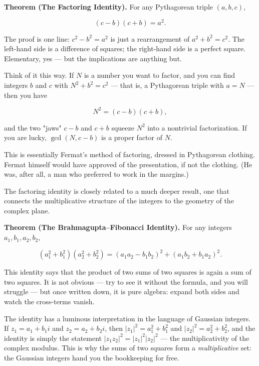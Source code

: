 \textbf{Theorem (The Factoring Identity).} For any Pythagorean triple $(a, b, c)$,

\[
(c - b)(c + b) = a^2.
\]

The proof is one line: $c^2 - b^2 = a^2$ is just a rearrangement of $a^2 + b^2 = c^2$. The left-hand side is a difference of squares; the right-hand side is a perfect square. Elementary, yes --- but the implications are anything but.

Think of it this way. If $N$ is a number you want to factor, and you can find integers $b$ and $c$ with $N^2 + b^2 = c^2$ --- that is, a Pythagorean triple with $a = N$ --- then you have

\[
N^2 = (c - b)(c + b),
\]

and the two "jaws" $c - b$ and $c + b$ squeeze $N^2$ into a nontrivial factorization. If you are lucky, $\gcd(N, c - b)$ is a proper factor of $N$.

This is essentially Fermat's method of factoring, dressed in Pythagorean clothing. Fermat himself would have approved of the presentation, if not the clothing. (He was, after all, a man who preferred to work in the margins.)

The factoring identity is closely related to a much deeper result, one that connects the multiplicative structure of the integers to the geometry of the complex plane.

\textbf{Theorem (The Brahmagupta--Fibonacci Identity).} For any integers $a_1, b_1, a_2, b_2$,

\[
(a_1^2 + b_1^2)(a_2^2 + b_2^2) = (a_1 a_2 - b_1 b_2)^2 + (a_1 b_2 + b_1 a_2)^2.
\]

This identity says that the product of two sums of two squares is again a sum of two squares. It is not obvious --- try to see it without the formula, and you will struggle --- but once written down, it is pure algebra: expand both sides and watch the cross-terms vanish.

The identity has a luminous interpretation in the language of Gaussian integers. If $z_1 = a_1 + b_1 i$ and $z_2 = a_2 + b_2 i$, then $|z_1|^2 = a_1^2 + b_1^2$ and $|z_2|^2 = a_2^2 + b_2^2$, and the identity is simply the statement $|z_1 z_2|^2 = |z_1|^2 |z_2|^2$ --- the multiplicativity of the complex modulus. This is why the sums of two squares form a \textit{multiplicative} set: the Gaussian integers hand you the bookkeeping for free.

